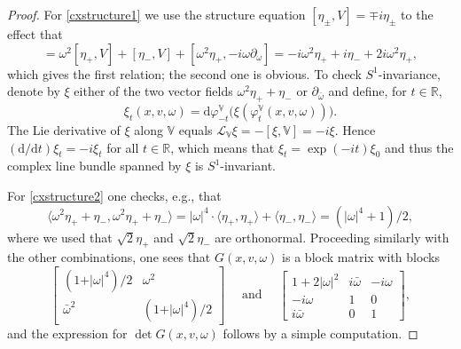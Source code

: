 \documentclass[JEP,XML,SOM,Unicode,published]{cedram}
\theoremstyle{plain}
\theoremstyle{definition}
\newcommand{\R}{\mathbb{R}}
\newcommand{\V}{\mathbb{V}}
\renewcommand{\L}{\mathcal{L}}
\renewcommand{\d}{\mathrm{d}}
\newcommand{\1}{{\bf 1}}
\begin{document}
\begin{proof}
For \eqref{cxstructure1} we use the structure equation $[\eta_\pm,V]=\mp i \eta_\pm$ to the effect that
\begin{equation*}
[\omega^2 \eta_+ + \eta_-,\V] = \omega^2 [\eta_+,V] + [\eta_-,V] + [\omega^2 \eta_+,-i \omega \partial_\omega] = -i \omega^2 \eta_+ + i\eta_- + 2i \omega^2 \eta_+,
\end{equation*}
which gives the first relation; the second one is obvious. To check $S^1$-invariance, denote by $\xi$ either of the two vector fields $\omega^2 \eta_+ + \eta_-$ or $\partial_{\bar \omega}$ and define, for $t\in \R$,
\begin{equation*}
\xi_t(x,v,\omega) = \d \varphi_{-t}^\V \bigl(\xi( \varphi^\V_t(x,v,\omega)) \bigr).
\end{equation*}
The Lie derivative of $\xi$ along $\V$ equals $\L_\V\xi=-[\xi,\V]=-i\xi$. Hence $({\d }/{\d t})\xi_t = -i\xi_t$ for all $t\in \R$, which means that $\xi_t=\exp(-it)\xi_0$ and thus the complex line bundle spanned by $\xi$ is $S^1$-invariant.

For \eqref{cxstructure2} one checks, e.g., that
\begin{equation*}
\langle \omega^2\eta_+ + \eta_-, \omega^2\eta_+ + \eta_- \rangle = \vert \omega \vert^4\cdot \langle \eta_+,\eta_+\rangle + \langle \eta_-,\eta_-\rangle =\left( \vert \omega \vert^4 + 1\right)/2,
\end{equation*}
where we used that $\sqrt 2 \eta_+$ and $\sqrt 2 \eta_-$ are orthonormal. Proceeding similarly with the other combinations, one sees that $G(x,v,\omega)$ is a block matrix with blocks
\begin{equation}\label{grammatrix}
\left[ \begin{matrix}
(1 + \vert \omega \vert^4)/2 & \omega^2\\
\bar \omega^2 & (1+\vert \omega \vert^4)/2
\end{matrix}\right]
\quad \text{ and } \quad
\left[
\begin{matrix}
1 + 2\vert \omega \vert^2 & i \bar \omega & -i \omega\\
-i \omega & 1 & 0 \\
i \bar\omega & 0 & 1
\end{matrix}
\right],
\end{equation}
and the expression for $\det G(x,v,\omega)$ follows by a simple computation.


\end{proof}
\end{document}
